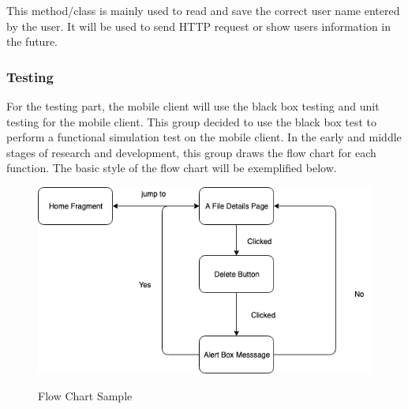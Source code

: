 \documentclass[11pt]{article}
\begin{document}
This method/class is mainly used to read and save the correct user name entered by the user. It will be used to send HTTP request or show users information in the future.

\subsubsection{Testing}
For the testing part, the mobile client will use the black box testing and unit testing for the mobile client. This group decided to use the black box test to perform a functional simulation test on the mobile client. In the early and middle stages of research and development, this group draws the flow chart for each function. The basic style of the flow chart will be exemplified below.

\begin{figure}[htbp]
	\centering
	\includegraphics[width=12cm]{8.png}\\
	\caption{Flow Chart Sample}
\end{figure}
\end{document}

